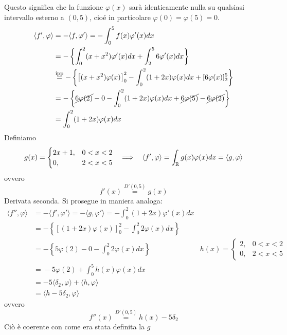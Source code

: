 Questo significa che la funzione $\varphi (x)$ sarà identicamente nulla su qualsiasi intervallo esterno a $(0, 5)$, cioé in particolare $\varphi (0) = \varphi (5) = 0$.
\begin{align*}
\langle f', \varphi \rangle & = - \langle f, \varphi '\rangle = - \int^{5}_{0} f(x)\varphi '(x)dx\\
 & = - \left\{\int^{2}_{0} (x + x^{2})\varphi '(x)dx + \int^{5}_{2} 6\varphi '(x)dx\right\}\\
 & \overset{\text{ipp}}{=} - \left\{\left[ (x + x^{2})\varphi (x)\right]^{2}_{0} - \int^{2}_{0} (1 + 2x)\varphi (x)dx + [ 6\varphi (x)]^{5}_{2}\right\}\\
 & = - \left\{\cancel{6\varphi (2)} - 0 - \int^{2}_{0}(1 + 2x) \varphi (x) dx + \cancel{6\varphi (5)} - \cancel{6\varphi (2)}\right\}\\
 & = \int^{2}_{0}(1 + 2x) \varphi (x) dx
\end{align*}
Definiamo
\begin{equation*}
g(x) =
\begin{cases}
2x + 1, & 0 < x < 2\\
0, & 2 < x < 5
\end{cases} \ \ \implies \ \ \langle f', \varphi \rangle = \int_{\mathbb{R}} g(x) \varphi (x) dx = \langle g, \varphi \rangle
\end{equation*}
ovvero
\begin{equation*}
f'(x)\overset{D'(0, 5)}{=} g(x)
\end{equation*}
Derivata seconda. Si prosegue in maniera analoga:
\begin{equation*}
\begin{aligned}
\langle f'', \varphi \rangle & = - \langle f', \varphi '\rangle = - \langle g, \varphi '\rangle = - \int^{2}_{0} (1 + 2x)\varphi '(x)dx & \\
 & = - \left\{[ (1 + 2x)\varphi (x)]^{2}_{0} - \int^{2}_{0} 2\varphi (x)dx\right\} & \\
 & = - \left\{5\varphi (2) - 0 - \int^{2}_{0} 2\varphi (x)dx\right\} & h(x) =
\begin{cases}
2, & 0 < x < 2\\
0, & 2 < x < 5
\end{cases}\\
 & \overset{}{=} - 5\varphi (2) + \int^{5}_{0} h(x)\varphi (x)dx & \\
 & = - 5\langle \delta_{2}, \varphi \rangle + \langle h, \varphi \rangle & \\
 & = \langle h - 5\delta_{2}, \varphi \rangle &
\end{aligned}
\end{equation*}
ovvero
\begin{equation*}
f''(x)\overset{D'(0, 5)}{=} h(x) - 5\delta_{2}
\end{equation*}
Ciò è coerente con come era stata definita la $g$


